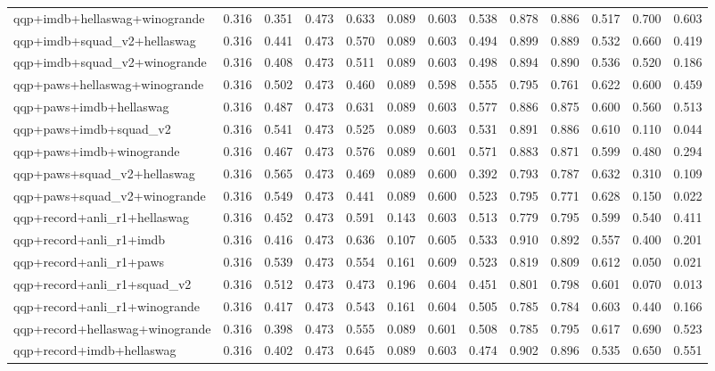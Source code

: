 \begin{table}[t]
\begin{tabular}{lrrrrrrrrrrrr}
    qqp+imdb+hellaswag+winogrande & 0.316 & 0.351 & 0.473 & 0.633 & 0.089 & 0.603 & 0.538 & 0.878 & 0.886 & 0.517 & 0.700 & 0.603 \\
    qqp+imdb+squad\_v2+hellaswag & 0.316 & 0.441 & 0.473 & 0.570 & 0.089 & 0.603 & 0.494 & 0.899 & 0.889 & 0.532 & 0.660 & 0.419 \\
    qqp+imdb+squad\_v2+winogrande & 0.316 & 0.408 & 0.473 & 0.511 & 0.089 & 0.603 & 0.498 & 0.894 & 0.890 & 0.536 & 0.520 & 0.186 \\
    qqp+paws+hellaswag+winogrande & 0.316 & 0.502 & 0.473 & 0.460 & 0.089 & 0.598 & 0.555 & 0.795 & 0.761 & 0.622 & 0.600 & 0.459 \\
    qqp+paws+imdb+hellaswag & 0.316 & 0.487 & 0.473 & 0.631 & 0.089 & 0.603 & 0.577 & 0.886 & 0.875 & 0.600 & 0.560 & 0.513 \\
    qqp+paws+imdb+squad\_v2 & 0.316 & 0.541 & 0.473 & 0.525 & 0.089 & 0.603 & 0.531 & 0.891 & 0.886 & 0.610 & 0.110 & 0.044 \\
    qqp+paws+imdb+winogrande & 0.316 & 0.467 & 0.473 & 0.576 & 0.089 & 0.601 & 0.571 & 0.883 & 0.871 & 0.599 & 0.480 & 0.294 \\
    qqp+paws+squad\_v2+hellaswag & 0.316 & 0.565 & 0.473 & 0.469 & 0.089 & 0.600 & 0.392 & 0.793 & 0.787 & 0.632 & 0.310 & 0.109 \\
    qqp+paws+squad\_v2+winogrande & 0.316 & 0.549 & 0.473 & 0.441 & 0.089 & 0.600 & 0.523 & 0.795 & 0.771 & 0.628 & 0.150 & 0.022 \\
    qqp+record+anli\_r1+hellaswag & 0.316 & 0.452 & 0.473 & 0.591 & 0.143 & 0.603 & 0.513 & 0.779 & 0.795 & 0.599 & 0.540 & 0.411 \\
    qqp+record+anli\_r1+imdb & 0.316 & 0.416 & 0.473 & 0.636 & 0.107 & 0.605 & 0.533 & 0.910 & 0.892 & 0.557 & 0.400 & 0.201 \\
    qqp+record+anli\_r1+paws & 0.316 & 0.539 & 0.473 & 0.554 & 0.161 & 0.609 & 0.523 & 0.819 & 0.809 & 0.612 & 0.050 & 0.021 \\
    qqp+record+anli\_r1+squad\_v2 & 0.316 & 0.512 & 0.473 & 0.473 & 0.196 & 0.604 & 0.451 & 0.801 & 0.798 & 0.601 & 0.070 & 0.013 \\
    qqp+record+anli\_r1+winogrande & 0.316 & 0.417 & 0.473 & 0.543 & 0.161 & 0.604 & 0.505 & 0.785 & 0.784 & 0.603 & 0.440 & 0.166 \\
    qqp+record+hellaswag+winogrande & 0.316 & 0.398 & 0.473 & 0.555 & 0.089 & 0.601 & 0.508 & 0.785 & 0.795 & 0.617 & 0.690 & 0.523 \\
    qqp+record+imdb+hellaswag & 0.316 & 0.402 & 0.473 & 0.645 & 0.089 & 0.603 & 0.474 & 0.902 & 0.896 & 0.535 & 0.650 & 0.551 \\

\end{tabular}
\end{table}
